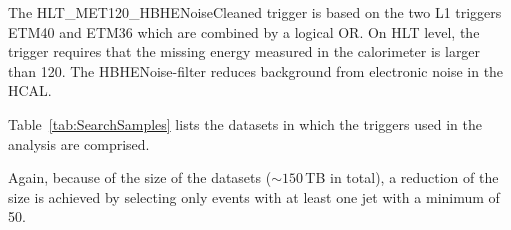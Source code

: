 The HLT\_MET120\_HBHENoiseCleaned trigger is based on the two L1 triggers ETM40 and ETM36 which are combined by a logical OR.
On HLT level, the trigger requires that the missing energy measured in the calorimeter is larger than 120\gev.
The HBHENoise-filter reduces background from electronic noise in the HCAL.

Table~\ref{tab:SearchSamples} lists the datasets in which the triggers used in the analysis are comprised. 
\renewcommand{\arraystretch}{1.5}
\begin{table}[!hbt]
\centering
\caption{MET data samples used in the search with the contained integrated luminosity.}
\label{tab:SearchSamples}
\end{table}  
Again, because of the size of the datasets ($\sim150\,$TB in total), a reduction of the size is achieved by selecting only events with at least one jet with a minimum \pt of 50\gev.\\

